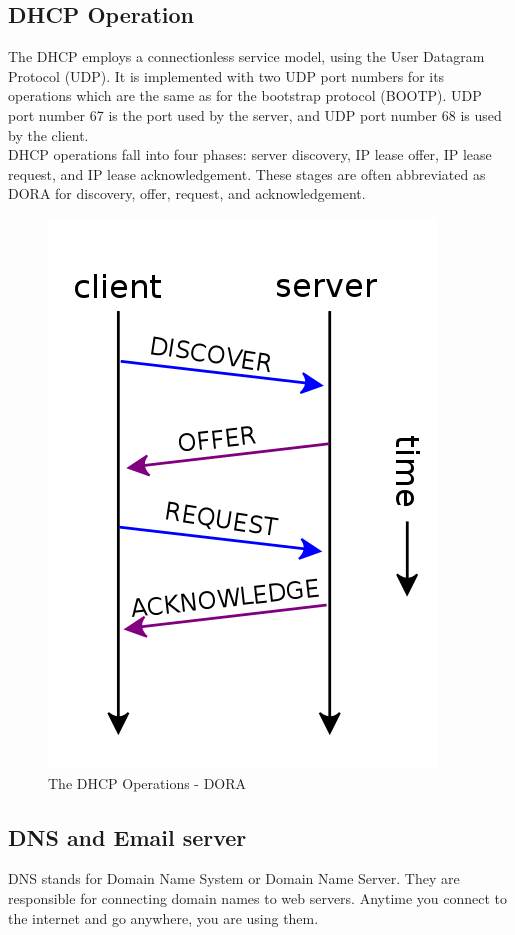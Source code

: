 \documentclass[11pt]{article}
\begin{document}
\subsection{DHCP Operation}
The DHCP employs a connectionless service model, using the User Datagram Protocol (UDP). It is implemented with two UDP port numbers for its operations which are the same as for the bootstrap protocol (BOOTP). UDP port number 67 is the port used by the server, and UDP port number 68 is used by the client.\\

DHCP operations fall into four phases: server discovery, IP lease offer, IP lease request, and IP lease acknowledgement. These stages are often abbreviated as DORA for discovery, offer, request, and acknowledgement.

\begin{figure}[H]
	\centering
	\includegraphics[scale = 0.4]{DHCP_session.svg.png}
	\caption{The DHCP Operations - DORA}
\end{figure}

\subsection{DNS and Email server}
DNS stands for Domain Name System or Domain Name Server. They are responsible for connecting domain names to web servers. Anytime you connect to the internet and go anywhere, you are using them.\\
\end{document}
